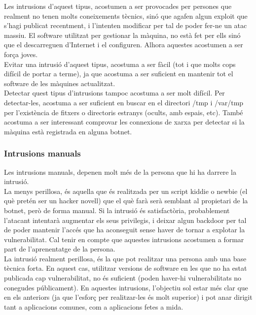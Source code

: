 Les intrusions d'aquest tipus, acostumen a ser provocades per persones que realment no tenen molts coneixements tècnics, sinó que 
agafen algun exploit que s'hagi publicat recentment, i l'intenten modificar per tal de poder fer-ne un atac massiu. El
software utilitzat per gestionar la màquina, no està fet per ells sinó que el descarreguen d'Internet i el configuren. Alhora
aquestes acostumen a ser força joves. \\

Evitar una intrusió d'aquest tipus, acostuma a ser fàcil (tot i que molts cops difícil de portar a terme), ja que 
acostuma a ser suficient en mantenir tot el software de les màquines actualitzat. \\

Detectar quest tipus d'intrusions tampoc acostuma a ser molt difícil. Per detectar-les, acostuma a ser suficient en buscar en el directori /tmp i /var/tmp
per l'existència de fitxers o directoris estranys (ocults, amb espais, etc). També acostuma a ser interessant comprovar 
les connexions de xarxa per detectar si la màquina està registrada en alguna botnet. \\

\subsubsection{Intrusions manuals}

Les intrusions manuals, depenen molt més de la persona que hi ha darrere la intrusió. \\

La menys perillosa, és aquella que és realitzada per un script kiddie o newbie (el què pretén ser un hacker novell) que 
el què farà serà semblant al propietari de la botnet, però de forma manual. Si la intrusió és satisfactòria, probablement
l'atacant intentarà augmentar els seus privilegis, i deixar algun backdoor per tal de poder mantenir l'accés que ha aconseguit
sense haver de tornar a explotar la vulnerabilitat. Cal tenir en compte que aquestes intrusions acostumen a formar part
de l'aprenentatge de la persona. \\

La intrusió realment perillosa, és la que pot realitzar una persona amb una base tècnica forta. En aquest cas, utilitzar
versions de software en les que no ha estat publicada cap vulnerabilitat, no és suficient (poden haver-hi vulnerabilitats
no conegudes públicament). En aquestes intrusions, l'objectiu sol estar més clar que en els anteriors (ja que 
l'esforç per realitzar-les és molt superior) i pot anar dirigit tant a aplicacions comunes, com a aplicacions fetes a mida. \\

